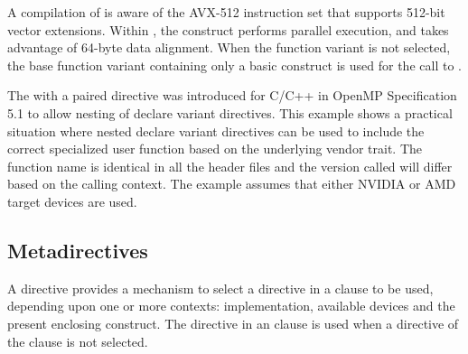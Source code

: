 A compilation of  is aware of
the AVX-512 instruction set that supports 512-bit vector extensions.
Within , the  construct performs parallel execution, and
takes advantage of 64-byte data alignment. 
When the  function variant is not selected, the base  function variant
containing only a basic  construct is used for the call to .




The  with a paired  directive was introduced 
for C/C++ in OpenMP Specification 5.1 to allow nesting of declare variant directives. 
This example shows a practical situation where nested declare variant directives can be used 
to include the correct specialized user function based on the underlying vendor  trait. 
The function name  is identical in all the header files and the version called will 
differ based on the calling context. The example assumes that either NVIDIA or AMD target devices are used. 



\subsection{Metadirectives}
\label{subsec:metadirective}

A  directive provides a mechanism to select a directive in
a  clause to be used, depending upon one or more contexts:  
implementation, available devices and the present enclosing construct. 
The directive in an  clause is used when a directive of the 
 clause is not selected.

